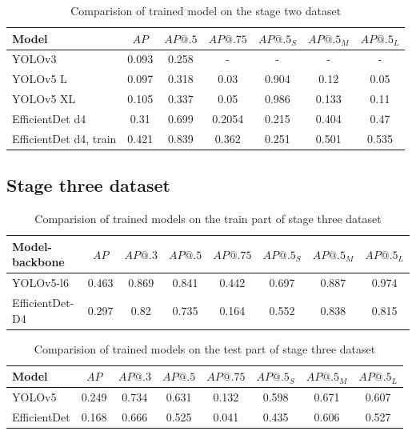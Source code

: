 \begin{table}[h]
    \centering
    \begin{tabular}{|l|c|c|c|c|c|c|}
        \hline
        Model                  & $AP$  & $AP@.5$ & $AP@.75$ & $AP@.5_S$ & $AP@.5_M$ & $AP@.5_L$ \\ \hline
        YOLOv3                 & 0.093 & 0.258   & -        & -         & -         & -         \\ \hline
        YOLOv5 L               & 0.097 & 0.318   & 0.03     & 0.904     & 0.12      & 0.05      \\ \hline
        YOLOv5 XL              & 0.105 & 0.337   & 0.05     & 0.986     & 0.133     & 0.11      \\ \hline
        EfficientDet d4        & 0.31  & 0.699   & 0.2054   & 0.215     & 0.404     & 0.47      \\ \hline
        EfficientDet d4, train & 0.421 & 0.839   & 0.362    & 0.251     & 0.501     & 0.535     \\ \hline
    \end{tabular}
    \caption{Comparision of trained model on the stage two dataset}
    \label{tab:model_results:stage_two}
\end{table}

\subsection{Stage three dataset}

\begin{table}[H]
    \centering
    \begin{tabular}{|l|c|c|c|c|c|c|c|}
        \hline
        Model-backbone  & $AP$  & $AP@.3$ & $AP@.5$ & $AP@.75$ & $AP@.5_S$ & $AP@.5_M$ & $AP@.5_L$ \\ \hline
        YOLOv5-l6       & 0.463 & 0.869   & 0.841   & 0.442    & 0.697     & 0.887     & 0.974     \\ \hline
        EfficientDet-D4 & 0.297 & 0.82    & 0.735   & 0.164    & 0.552     & 0.838     & 0.815     \\ \hline
    \end{tabular}
    \caption{Comparision of trained models on the train part of stage three dataset}
    \label{tab:model_results:stage_three:train}
\end{table}

\begin{table}[H]
    \centering
    \begin{tabular}{|l|c|c|c|c|c|c|c|}
        \hline
        Model        & $AP$  & $AP@.3$ & $AP@.5$ & $AP@.75$ & $AP@.5_S$ & $AP@.5_M$ & $AP@.5_L$ \\ \hline
        YOLOv5       & 0.249 & 0.734   & 0.631   & 0.132    & 0.598     & 0.671     & 0.607     \\ \hline
        EfficientDet & 0.168 & 0.666   & 0.525   & 0.041    & 0.435     & 0.606     & 0.527     \\ \hline
    \end{tabular}
    \caption{Comparision of trained models on the test part of stage three dataset}
    \label{tab:model_results:stage_three:test}
\end{table}


